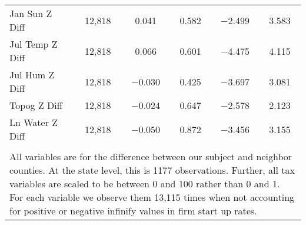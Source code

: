 \begin{table}[!htbp]
\begin{tabular}{@{\extracolsep{5pt}}lccccc}
Jan Sun Z Diff & 12,818 & 0.041 & 0.582 & $-$2.499 & 3.583 \\ 
Jul Temp Z Diff & 12,818 & 0.066 & 0.601 & $-$4.475 & 4.115 \\ 
Jul Hum Z Diff & 12,818 & $-$0.030 & 0.425 & $-$3.697 & 3.081 \\ 
Topog Z Diff & 12,818 & $-$0.024 & 0.647 & $-$2.578 & 2.123 \\ 
Ln Water Z Diff & 12,818 & $-$0.050 & 0.872 & $-$3.456 & 3.155 \\ 
\hline \\[-1.8ex] 
\multicolumn{6}{l}{All variables are for the difference between our subject and neighbor counties. At the state level, this is 1177 observations. Further, all tax variables are scaled to be between 0 and 100 rather than 0 and 1. For each variable we observe them 13,115 times when not accounting for positive or negative infinify values in firm start up rates.} \\ 
\end{tabular} 
\end{table} 
